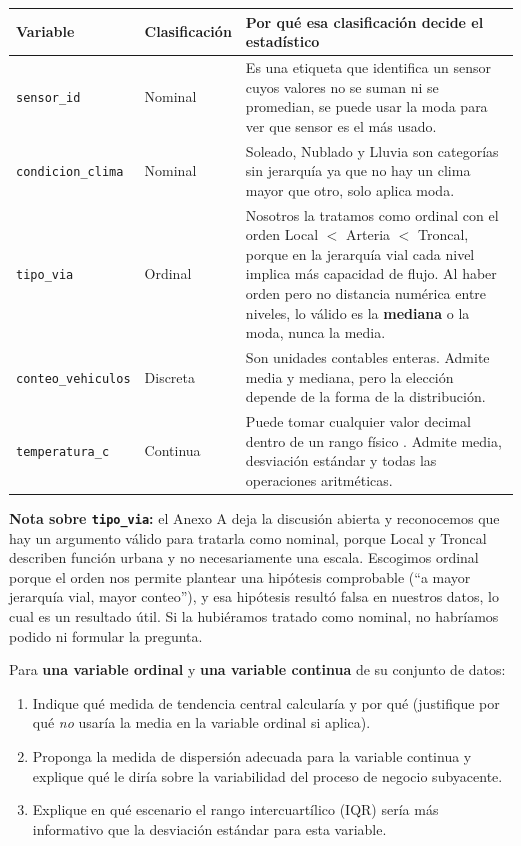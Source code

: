 \documentclass[11pt]{article}
\begin{document}
\begin{respuesta}[Respuesta 1.1]
{\small
\begin{longtable}{p{3.4cm}p{1.9cm}p{9.0cm}}
\toprule
Variable & Clasificación & Por qué esa clasificación decide el estadístico \\
\midrule
\texttt{sensor\_id} & Nominal & Es una etiqueta que identifica un sensor cuyos valores no se suman ni se promedian, se puede usar la moda para ver que sensor es el más usado. \\
\texttt{condicion\_clima} & Nominal & Soleado, Nublado y Lluvia son categorías sin jerarquía ya que no hay un clima mayor que otro, solo aplica moda. \\
\texttt{tipo\_via} & Ordinal & Nosotros la tratamos como ordinal con el orden Local $<$ Arteria $<$ Troncal, porque en la jerarquía vial cada nivel implica más capacidad de flujo. Al haber orden pero no distancia numérica entre niveles, lo válido es la \textbf{mediana} o la moda, nunca la media. \\
\texttt{conteo\_vehiculos} & Discreta & Son unidades contables enteras. Admite media y mediana, pero la elección depende de la forma de la distribución. \\
\texttt{temperatura\_c} & Continua & Puede tomar cualquier valor decimal dentro de un rango físico . Admite media, desviación estándar y todas las operaciones aritméticas. \\
\bottomrule
\end{longtable}
}

\noindent\textbf{Nota sobre \texttt{tipo\_via}:} el Anexo A deja la discusión abierta y reconocemos que hay un argumento válido para tratarla como nominal, porque Local y Troncal describen función urbana y no necesariamente una escala. Escogimos ordinal porque el orden nos permite plantear una hipótesis comprobable (``a mayor jerarquía vial, mayor conteo''), y esa hipótesis resultó falsa en nuestros datos, lo cual es un resultado útil. Si la hubiéramos tratado como nominal, no habríamos podido ni formular la pregunta.
\end{respuesta}


\begin{pregunta}
Para \textbf{una variable ordinal} y \textbf{una variable continua} de su conjunto de datos:
\begin{enumerate}[label=\alph*)]
  \item Indique qué medida de tendencia central calcularía y por qué (justifique por qué \emph{no} usaría la media en la variable ordinal si aplica).
  \item Proponga la medida de dispersión adecuada para la variable continua y explique qué le diría sobre la variabilidad del proceso de negocio subyacente.
  \item Explique en qué escenario el rango intercuartílico (IQR) sería más informativo que la desviación estándar para esta variable.
\end{enumerate}
\end{pregunta}
\end{document}
